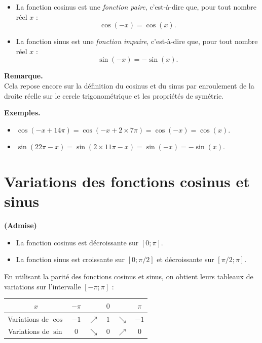 \documentclass[11pt]{article}
\newenvironment{remarque}{\par\smallskip\noindent\textbf{Remarque. \\}\ignorespaces}{\par\smallskip}
\newenvironment{exemples}{\par\smallskip\noindent\textbf{Exemples. \\}\ignorespaces}{\par\smallskip}
\begin{document}
\begin{propriete}
\begin{itemize}
    \item La fonction cosinus est une \emph{fonction paire}, c'est-à-dire que, pour tout nombre réel $x$ :
    \[
    \cos(-x)=\cos(x).
    \]
    \item La fonction sinus est une \emph{fonction impaire}, c'est-à-dire que, pour tout nombre réel $x$ :
    \[
    \sin(-x)=-\sin(x).
    \]
\end{itemize}
\end{propriete}

\begin{remarque}
Cela repose encore sur la définition du cosinus et du sinus par enroulement de la droite réelle sur le cercle trigonométrique et les propriétés de symétrie.
\end{remarque}

\begin{exemples}
\begin{itemize}
    \item $\cos(-x+14\pi)=\cos(-x+2\times7\pi)=\cos(-x)=\cos(x)$.
    \item $\sin(22\pi-x)=\sin(2\times11\pi-x)=\sin(-x)=-\sin(x)$.
\end{itemize}
\end{exemples}

\section{Variations des fonctions cosinus et sinus}

\begin{propriete}
\textbf{(Admise)}
\begin{itemize}
    \item La fonction cosinus est décroissante sur $[0;\pi]$.
    \item La fonction sinus est croissante sur $[0;\pi/2]$ et décroissante sur $[\pi/2;\pi]$.
\end{itemize}
\end{propriete}

En utilisant la parité des fonctions cosinus et sinus, on obtient leurs tableaux de variations sur l'intervalle $[-\pi;\pi]$ :

\begin{center}
\renewcommand{\arraystretch}{1.4}
\begin{tabular}{c|ccccc}
$x$ & $-\pi$ & & $0$ & & $\pi$ \\
\hline
Variations de $\cos$ & $-1$ & $\nearrow$ & $1$ & $\searrow$ & $-1$ \\
Variations de $\sin$ & $0$ & $\searrow$ & $0$ & $\nearrow$ & $0$
\end{tabular}
\end{center}
\end{document}
